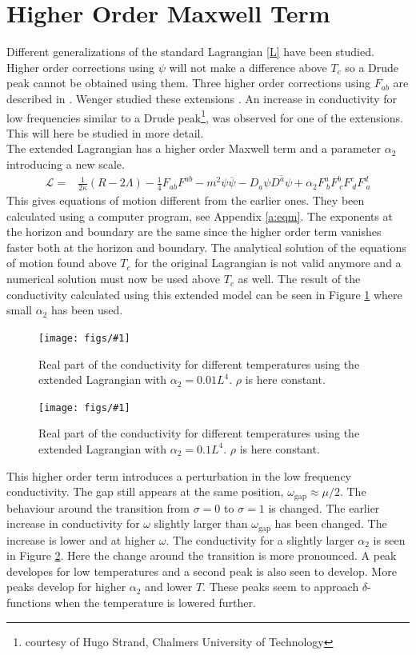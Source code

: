 \documentclass[12pt]{report}
\newcommand{\fig}[2]{
\begin{figure}
\centering
\texttt{[image: figs/\#1]}
\caption{#2}
\end{figure}
}
\begin{document}
\section{Higher Order Maxwell Term}
Different generalizations of the standard Lagrangian \eqref{L} have been studied. Higher order corrections using $\psi$ will not make a difference above $T_c$ so a Drude peak cannot be obtained using them. Three higher order corrections using $F_{ab}$ are described in \cite{Myers:2010pk}. Wenger studied these extensions \cite{Wenger2012}. An increase in conductivity for low frequencies similar to a Drude peak\footnote{courtesy of Hugo Strand, Chalmers University of Technology}, was observed for one of the extensions. This will here be studied in more detail.\\
The extended Lagrangian has a higher order Maxwell term and a parameter $\alpha_2$ introducing a new scale.
\begin{eqnarray}
 \mathcal{L}=&\frac{1}{2\kappa}\left(R-2\Lambda\right)-\frac{1}{4}F_{ab}F^{ab}-m^2\psi\overline{\psi}-D_a\psi\overline{D^a\psi}
+\alpha_2F^a_{\ b}F^b_{\ c}F^c_{\ d}F^d_{\ a}\label{L2}
\end{eqnarray}
This gives equations of motion different from the earlier ones. They been calculated using a computer program, see Appendix \ref{a:eqm}. The exponents at the horizon and boundary are the same since the higher order term vanishes faster both at the horizon and boundary. The analytical solution of the equations of motion found above $T_c$ for the original Lagrangian is not valid anymore and a numerical solution must now be used above $T_c$ as well. The result of the conductivity calculated using this extended model can be seen in Figure \ref{f:cond_a2_1} where  small $\alpha_2$ has been used.

\fig{cond_Ts_a2_0.01_v2.pdf}{Real part of the conductivity for different temperatures using the extended Lagrangian with $\alpha_2=0.01L^4$. $\rho$ is here constant.\label{f:cond_a2_1}}

\fig{cond_Ts_a2_0.1_v2.pdf}{Real part of the conductivity for different temperatures using the extended Lagrangian with $\alpha_2=0.1L^4$. $\rho$ is here constant.\label{f:cond_a2_2}}

This higher order term introduces a perturbation in the low frequency conductivity. The gap still appears at the same position, $\omega_\mathrm{gap}\approx\mu/2$. The behaviour around the transition from $\sigma=0$ to $\sigma=1$ is changed. The earlier increase in conductivity for $\omega$ slightly larger than $\omega_\mathrm{gap}$ has been changed. The increase is lower and at higher $\omega$. The conductivity for a slightly larger $\alpha_2$ is seen in Figure \ref{f:cond_a2_2}. Here the change around the transition is more pronounced. A peak developes for low temperatures and a second peak is also seen to develop. More peaks develop for higher $\alpha_2$ and lower $T$. These peaks seem to approach $\delta$-functions when the temperature is lowered further.\\
\end{document}
